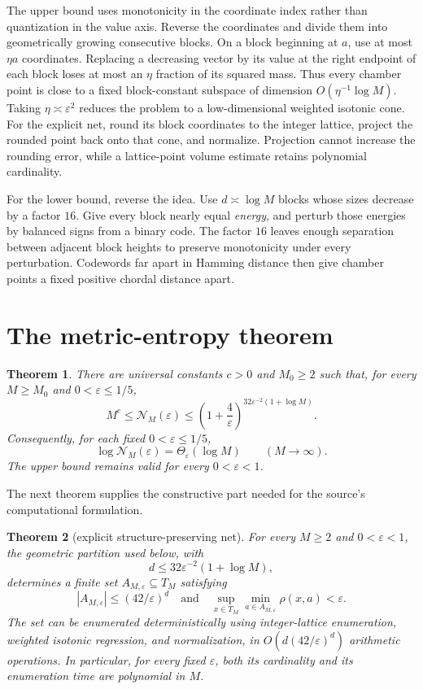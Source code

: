 \documentclass[11pt]{article}
\newtheorem{theorem}{Theorem}
\newcommand{\cN}{\mathcal N}
\begin{document}
The upper bound uses monotonicity in the coordinate index rather than
quantization in the value axis.  Reverse the coordinates and divide them into
geometrically growing consecutive blocks.  On a block beginning at $a$, use at
most $\eta a$ coordinates.  Replacing a decreasing vector by its value at the
right endpoint of each block loses at most an $\eta$ fraction of its squared
mass.  Thus every chamber point is close to a fixed block-constant subspace of
dimension $O(\eta^{-1}\log M)$.  Taking
$\eta\asymp\varepsilon^2$ reduces the problem to a low-dimensional weighted
isotonic cone.  For the explicit net, round its block coordinates to the
integer lattice, project the rounded point back onto that cone, and normalize.
Projection cannot increase the rounding error, while a lattice-point volume
estimate retains polynomial cardinality.

For the lower bound, reverse the idea.  Use $d\asymp\log M$ blocks whose sizes
decrease by a factor $16$.  Give every block nearly equal \emph{energy}, and
perturb those energies by balanced signs from a binary code.  The factor $16$
leaves enough separation between adjacent block heights to preserve
monotonicity under every perturbation.  Codewords far apart in Hamming distance
then give chamber points a fixed positive chordal distance apart.

\section{The metric-entropy theorem}

\begin{theorem}\label{thm:main}
There are universal constants $c>0$ and $M_0\geq2$ such that, for every
$M\geq M_0$ and $0<\varepsilon\leq1/5$,
\begin{equation}\label{eq:main}
 M^c\leq \cN_M(\varepsilon)
 \leq
 \left(1+\frac4\varepsilon\right)^{
 32\varepsilon^{-2}(1+\log M)}.
\end{equation}
Consequently, for each fixed $0<\varepsilon\leq1/5$,
\[
 \log \cN_M(\varepsilon)=\Theta_\varepsilon(\log M)
 \qquad(M\to\infty).
\]
The upper bound remains valid for every $0<\varepsilon<1$.
\end{theorem}

The next theorem supplies the constructive part needed for the source's
computational formulation.

\begin{theorem}[explicit structure-preserving net]\label{thm:explicit}
For every $M\geq2$ and $0<\varepsilon<1$, the geometric partition used below,
with
\[
 d\leq32\varepsilon^{-2}(1+\log M),
\]
determines a finite set $A_{M,\varepsilon}\subseteq T_M$ satisfying
\[
 |A_{M,\varepsilon}|\leq(42/\varepsilon)^d
 \quad\text{and}\quad
 \sup_{x\in T_M}\min_{a\in A_{M,\varepsilon}}\rho(x,a)<\varepsilon.
\]
The set can be enumerated deterministically using integer-lattice enumeration,
weighted isotonic regression, and normalization, in
$O(d(42/\varepsilon)^d)$ arithmetic operations.  In particular, for every
fixed $\varepsilon$, both its cardinality and its enumeration time are
polynomial in $M$.
\end{theorem}
\end{document}
